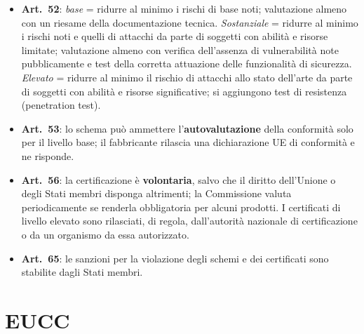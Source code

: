 \begin{integrazione}
\begin{itemize}
  \item \textbf{Art.~52}: \emph{base} = ridurre al minimo i rischi di base noti; valutazione almeno con un
    riesame della documentazione tecnica. \emph{Sostanziale} = ridurre al minimo i rischi noti e quelli
    di attacchi da parte di soggetti con abilità e risorse limitate; valutazione almeno con verifica
    dell'assenza di vulnerabilità note pubblicamente e test della corretta attuazione delle funzionalità
    di sicurezza. \emph{Elevato} = ridurre al minimo il rischio di attacchi allo stato dell'arte da parte
    di soggetti con abilità e risorse significative; si aggiungono test di resistenza (penetration test).
  \item \textbf{Art.~53}: lo schema può ammettere l'\textbf{autovalutazione} della conformità solo per il
    livello base; il fabbricante rilascia una dichiarazione UE di conformità e ne risponde.
  \item \textbf{Art.~56}: la certificazione è \textbf{volontaria}, salvo che il diritto dell'Unione o degli
    Stati membri disponga altrimenti; la Commissione valuta periodicamente se renderla obbligatoria per
    alcuni prodotti. I certificati di livello elevato sono rilasciati, di regola, dall'autorità nazionale
    di certificazione o da un organismo da essa autorizzato.
  \item \textbf{Art.~65}: le sanzioni per la violazione degli schemi e dei certificati sono stabilite
    dagli Stati membri.
\end{itemize}
\end{integrazione}

\section{EUCC}
\label{sec:csa-eucc}

